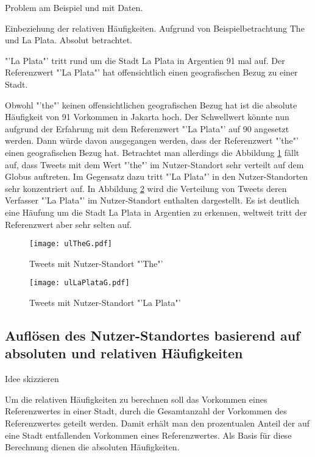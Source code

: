 			Problem am Beispiel und mit Daten.

			Einbeziehung der relativen Häufigkeiten. 
			Aufgrund von Beispielbetrachtung The und La Plata. Absolut betrachtet.


			"'La Plata"' tritt rund um die Stadt La Plata in Argentien 91 mal auf.
			Der Referenzwert "'La Plata"' hat offensichtlich einen geografischen Bezug zu einer Stadt. 

			Obwohl "'the"' keinen offensichtlichen geografischen Bezug hat ist die absolute Häufigkeit von 91 Vorkommen in Jakarta hoch.
			Der Schwellwert könnte nun aufgrund der Erfahrung mit dem Referenzwert "'La Plata"' auf 90 angesetzt werden.
			Dann würde davon ausgegangen werden, dass der Referenzwert "'the"' einen geografischen Bezug hat.
			Betrachtet man allerdings die Abbildung \ref{img:ULThe} fällt auf, dass Tweets mit dem Wert "'the"' im Nutzer-Standort sehr verteilt auf dem Globus auftreten.
			Im Gegensatz dazu tritt "'La Plata"' in den Nutzer-Standorten sehr konzentriert auf.
			In Abbildung \ref{img:ULlaPlata} wird die Verteilung von Tweets deren Verfasser "'La Plata"' im Nutzer-Standort enthalten dargestellt. 
			Es ist deutlich eine Häufung um die Stadt La Plata in Argentien zu erkennen, weltweit tritt der Referenzwert aber sehr selten auf.
			\begin{figure} 
				\begin{center}
					\texttt{[image: ulTheG.pdf]}
					\caption{Tweets mit Nutzer-Standort "'The"'}
					\label{img:ULThe}
					\end{center}
				\end{figure}
			\begin{figure}
			\begin{center}
					\texttt{[image: ulLaPlataG.pdf]}
					\caption{Tweets mit Nutzer-Standort "'La Plata"'}
					\label{img:ULlaPlata}
				\end{center}
			\end{figure}		

		\subsection{Auflösen des Nutzer-Standortes basierend auf absoluten und relativen Häufigkeiten} 

			Idee skizzieren


				Um die relativen Häufigkeiten zu berechnen soll das Vorkommen eines Referenzwertes in einer Stadt, durch die Gesamtanzahl der Vorkommen des Referenzwertes geteilt werden.
				Damit erhält man den prozentualen Anteil der auf eine Stadt entfallenden Vorkommen eines Referenzwertes.
				Als Basis für diese Berechnung dienen die absoluten Häufigkeiten.


